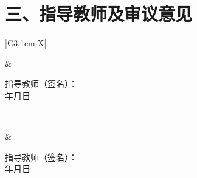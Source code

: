 \documentclass[UTF8,a4paper,zihao=-4]{ctexart}
\newcommand{\emptyline}[1][4.5cm]{\underline{\makebox[#1]{}}}
\newcommand{\vlabel}[2]{%
\begin{minipage}[c][#1][c]{\linewidth}
\centering #2
\end{minipage}%
}
\begin{document}
\section*{三、指导教师及审议意见}

\noindent
\begin{tabularx}{\textwidth}{|C{3.1cm}|X|}
    \hline
    
    \vlabel{8.7cm}{}
    &
    \begin{minipage}[c][8.7cm][t]{\linewidth}
        \vspace{1em}
        
        \lipsum[1]
        
        \vfill
        \begin{flushright}
            \hspace*{\fill}
            \begin{minipage}{6.8cm}
                指导教师（签名）：\emptyline[3.5cm]\\[0.8em]
                \hspace*{4cm}年\hspace{1.5em}月\hspace{1.5em}日
            \end{minipage}
        \end{flushright}
        \vspace{0.4em}
    \end{minipage}
    \\ \hline

    \vlabel{8.7cm}{}
    &
    \begin{minipage}[c][8.7cm][t]{\linewidth}
        \vspace{1em}
        
        \lipsum[1]
        
        \vfill
        \begin{flushright}
            \hspace*{\fill}
            \begin{minipage}{6.8cm}
                指导教师（签名）：\emptyline[3.5cm]\\[0.8em]
                \hspace*{4cm}年\hspace{1.5em}月\hspace{1.5em}日
            \end{minipage}
        \end{flushright}
        \vspace{0.4em}
    \end{minipage}
    \\ \hline

\end{tabularx}
\end{document}
